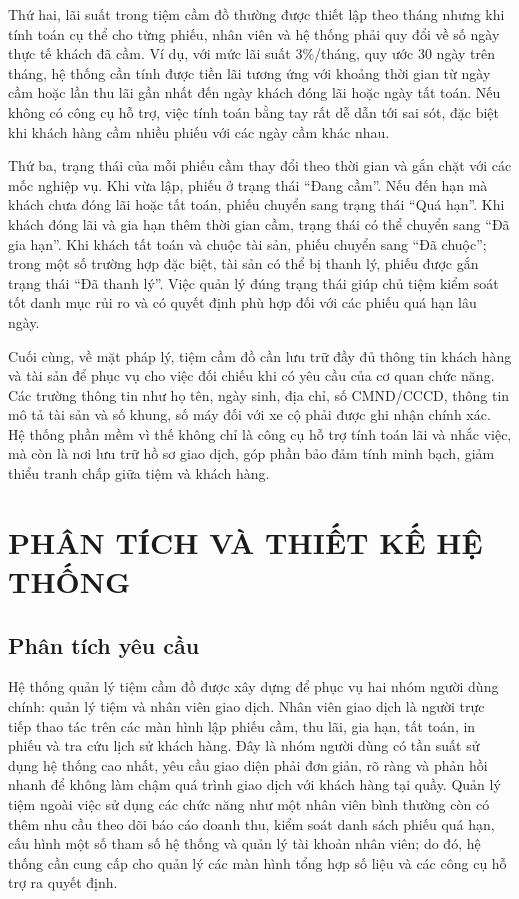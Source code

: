 \documentclass[13pt,a4paper]{extreport}
\begin{document}
Thứ hai, lãi suất trong tiệm cầm đồ thường được thiết lập theo tháng nhưng khi tính toán cụ thể cho từng phiếu, nhân viên và hệ thống phải quy đổi về số ngày thực tế khách đã cầm. Ví dụ, với mức lãi suất 3\%/tháng, quy ước 30 ngày trên tháng, hệ thống cần tính được tiền lãi tương ứng với khoảng thời gian từ ngày cầm hoặc lần thu lãi gần nhất đến ngày khách đóng lãi hoặc ngày tất toán. Nếu không có công cụ hỗ trợ, việc tính toán bằng tay rất dễ dẫn tới sai sót, đặc biệt khi khách hàng cầm nhiều phiếu với các ngày cầm khác nhau.

Thứ ba, trạng thái của mỗi phiếu cầm thay đổi theo thời gian và gắn chặt với các mốc nghiệp vụ. Khi vừa lập, phiếu ở trạng thái ``Đang cầm''. Nếu đến hạn mà khách chưa đóng lãi hoặc tất toán, phiếu chuyển sang trạng thái ``Quá hạn''. Khi khách đóng lãi và gia hạn thêm thời gian cầm, trạng thái có thể chuyển sang ``Đã gia hạn''. Khi khách tất toán và chuộc tài sản, phiếu chuyển sang ``Đã chuộc''; trong một số trường hợp đặc biệt, tài sản có thể bị thanh lý, phiếu được gắn trạng thái ``Đã thanh lý''. Việc quản lý đúng trạng thái giúp chủ tiệm kiểm soát tốt danh mục rủi ro và có quyết định phù hợp đối với các phiếu quá hạn lâu ngày.

Cuối cùng, về mặt pháp lý, tiệm cầm đồ cần lưu trữ đầy đủ thông tin khách hàng và tài sản để phục vụ cho việc đối chiếu khi có yêu cầu của cơ quan chức năng. Các trường thông tin như họ tên, ngày sinh, địa chỉ, số CMND/CCCD, thông tin mô tả tài sản và số khung, số máy đối với xe cộ phải được ghi nhận chính xác. Hệ thống phần mềm vì thế không chỉ là công cụ hỗ trợ tính toán lãi và nhắc việc, mà còn là nơi lưu trữ hồ sơ giao dịch, góp phần bảo đảm tính minh bạch, giảm thiểu tranh chấp giữa tiệm và khách hàng.

\chapter{PHÂN TÍCH VÀ THIẾT KẾ HỆ THỐNG}

\section{Phân tích yêu cầu}

Hệ thống quản lý tiệm cầm đồ được xây dựng để phục vụ hai nhóm người dùng chính: quản lý tiệm và nhân viên giao dịch. Nhân viên giao dịch là người trực tiếp thao tác trên các màn hình lập phiếu cầm, thu lãi, gia hạn, tất toán, in phiếu và tra cứu lịch sử khách hàng. Đây là nhóm người dùng có tần suất sử dụng hệ thống cao nhất, yêu cầu giao diện phải đơn giản, rõ ràng và phản hồi nhanh để không làm chậm quá trình giao dịch với khách hàng tại quầy. Quản lý tiệm ngoài việc sử dụng các chức năng như một nhân viên bình thường còn có thêm nhu cầu theo dõi báo cáo doanh thu, kiểm soát danh sách phiếu quá hạn, cấu hình một số tham số hệ thống và quản lý tài khoản nhân viên; do đó, hệ thống cần cung cấp cho quản lý các màn hình tổng hợp số liệu và các công cụ hỗ trợ ra quyết định.
\end{document}
